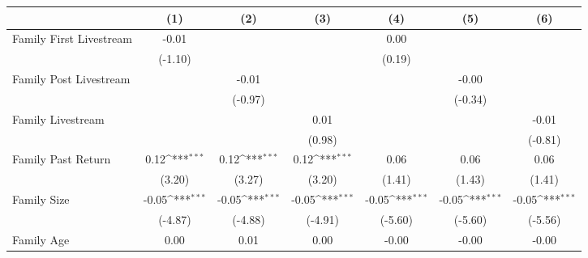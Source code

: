 {
\def\sym#1{\ifmmode^{#1}\else\(^{#1}\)\fi}
\begin{tabular}{l*{6}{c}}
\toprule
                    &\multicolumn{1}{c}{(1)}         &\multicolumn{1}{c}{(2)}         &\multicolumn{1}{c}{(3)}         &\multicolumn{1}{c}{(4)}         &\multicolumn{1}{c}{(5)}         &\multicolumn{1}{c}{(6)}         \\
\midrule
Family First Livestream&       -0.01         &                     &                     &        0.00         &                     &                     \\
                    &     (-1.10)         &                     &                     &      (0.19)         &                     &                     \\
\addlinespace
Family Post Livestream&                     &       -0.01         &                     &                     &       -0.00         &                     \\
                    &                     &     (-0.97)         &                     &                     &     (-0.34)         &                     \\
\addlinespace
Family Livestream   &                     &                     &        0.01         &                     &                     &       -0.01         \\
                    &                     &                     &      (0.98)         &                     &                     &     (-0.81)         \\
\addlinespace
Family Past Return  &        0.12\sym{***}&        0.12\sym{***}&        0.12\sym{***}&        0.06         &        0.06         &        0.06         \\
                    &      (3.20)         &      (3.27)         &      (3.20)         &      (1.41)         &      (1.43)         &      (1.41)         \\
\addlinespace
Family Size         &       -0.05\sym{***}&       -0.05\sym{***}&       -0.05\sym{***}&       -0.05\sym{***}&       -0.05\sym{***}&       -0.05\sym{***}\\
                    &     (-4.87)         &     (-4.88)         &     (-4.91)         &     (-5.60)         &     (-5.60)         &     (-5.56)         \\
\addlinespace
Family Age          &        0.00         &        0.01         &        0.00         &       -0.00         &       -0.00         &       -0.00         \\

\end{tabular}}

